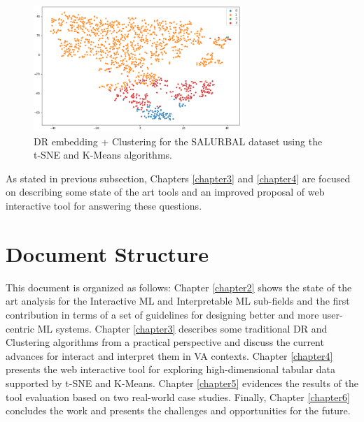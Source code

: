 \begin{figure}[ht]
 \centering
 \includegraphics[width=0.7\textwidth]{salurbal-kmeans-tsne.png}
 \caption{DR embedding + Clustering for the SALURBAL dataset using the t-SNE and K-Means algorithms.}
 \label{fig:salurbal-kmeans-tsne}
\end{figure}

As stated in previous subsection, Chapters \ref{chapter3} and \ref{chapter4} are focused on describing some state of the art tools and an improved proposal of web interactive tool for answering these questions. 

\section{Document Structure} %
\label{section1.2}

This document is organized as follows: Chapter \ref{chapter2} shows the state of the art analysis for the Interactive ML and Interpretable ML sub-fields and the first contribution in terms of a set of guidelines for designing better and more user-centric ML systems. Chapter \ref{chapter3} describes some traditional DR and Clustering algorithms from a practical perspective and discuss the current advances for interact and interpret them in VA contexts. Chapter \ref{chapter4} presents the web interactive tool for exploring high-dimensional tabular data supported by t-SNE and K-Means. Chapter \ref{chapter5} evidences the results of the tool evaluation based on two real-world case studies. Finally, Chapter \ref{chapter6} concludes the work and presents the challenges and opportunities for the future.